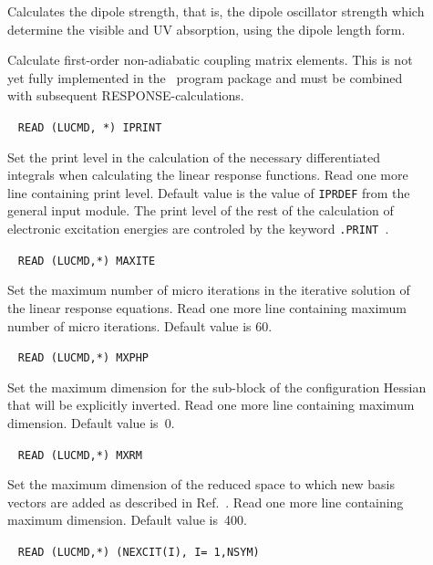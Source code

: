 \begin{description}
\item[] Calculates the dipole strength, that is, the 
dipole oscillator strength which determine the visible and UV
absorption, using the dipole length form.

\item[] Calculate first-order non-adiabatic coupling
matrix elements. This is not yet
fully implemented in the \aba\ 
program package and must be combined with subsequent
RESPONSE-calculations.

\item[]\verb| |\newline
\verb|READ (LUCMD, *) IPRINT|

Set the print level in the calculation of the necessary differentiated
integrals when calculating the linear response functions. Read one
more line containing print level. Default value is the value of 
\verb|IPRDEF| from the general input module. The print level of the
rest of the calculation of electronic excitation energies are
controled by the keyword \verb|.PRINT |. 

\item[]\verb| |\newline
\verb|READ (LUCMD,*) MAXITE|

Set the maximum number of micro iterations in the iterative
solution of the linear response equations. Read
one more line containing maximum number of micro iterations.
Default value is 60.

\item[]\verb| |\newline
\verb|READ (LUCMD,*) MXPHP|

Set the maximum dimension for the sub-block of the configuration
Hessian that will be explicitly inverted. Read one more line
containing maximum dimension. Default value is~0.

\item[]\verb| |\newline
\verb|READ (LUCMD,*) MXRM|

Set the maximum dimension of the reduced space to which new basis
vectors are added as described in Ref.~\cite{tuhjahjajpjjcp84}. Read
one more line containing maximum dimension. Default value is~400.

\item[]\verb| |\newline
\verb|READ (LUCMD,*) (NEXCIT(I), I= 1,NSYM)|


\end{description}

